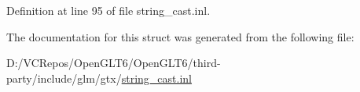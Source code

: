 Definition at line 95 of file string\+\_\+cast.\+inl.



The documentation for this struct was generated from the following file\+:\begin{DoxyCompactItemize}
\item 
D\+:/\+V\+C\+Repos/\+Open\+G\+L\+T6/\+Open\+G\+L\+T6/third-\/party/include/glm/gtx/\mbox{\hyperlink{string__cast_8inl}{string\+\_\+cast.\+inl}}\end{DoxyCompactItemize}
